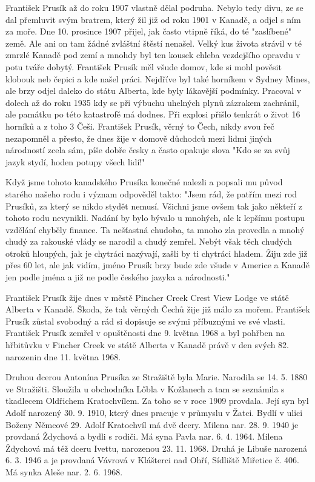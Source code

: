 \documentclass[../dejiny-rodu-prusiku.tex]{subfiles}
\begin{document}
František Prusík až do roku 1907 vlastně dělal podruha. Nebylo tedy divu, ze se dal přemluvit svým bratrem, který žil již od roku 1901 v Kanadě, a odjel s ním za moře. Dne 10. prosince 1907 přijel, jak často vtipně říká, do té "zaslíbené" země. Ale ani on tam žádné zvláštní štěstí nenašel. Velký kus života strávil v té zmrzlé Kanadě pod zemí a mnohdy byl ten kousek chleba vezdejšího opravdu v potu tváře dobytý. František Prusík měl všude domov, kde si mohl pověsit klobouk neb čepici a kde našel práci. Nejdříve byl také horníkem v Sydney Mines, ale brzy odjel daleko do státu Alberta, kde byly lákavější podmínky. Pracoval v dolech až do roku 1935 kdy se při výbuchu uhelných plynů zázrakem zachránil, ale památku po této katastrofě má dodnes. Při explosi přišlo tenkrát o život 16 horníků a z toho 3 Češi. František Prusík, věrný to Čech, nikdy svou řeč nezapomněl a přesto, že dnes žije v domově důchodců mezi lidmi jiných národností zcela sám,  píše dobře česky a často opakuje slova "Kdo se za svůj jazyk stydí, hoden potupy všech lidí!"

Když jsme tohoto kanadského Prusíka konečné nalezli a popsali mu původ starého našeho rodu i význam odpově­děl takto: "Jsem rád, že patřím mezi rod Prusíků, za který se nikdo stydět nemusí. Všichni jsme ovšem tak jako někteří z tohoto rodu nevynikli. Nadání by bylo bývalo u mnohých, ale k lepšímu postupu vzdělání chyběly finance. Ta nešťastná chudoba, ta mnoho zla provedla a mnohý chudý za rakouské vlády se narodil a chudý zemřel. Nebýt však těch chudých otroků hloupých, jak je chytrá­ci nazývají, zašli by ti chytráci hladem. Žiju zde již přes 60 let, ale jak vidím, jméno Prusík brzy bude zde všude v Americe a Kanadě jen podle jména a již ne podle českého jazyka a národnosti."

František Prusík žije dnes v městě Pincher Creek Crest View Lodge ve státě Alberta v Kanadě. Škoda, že tak věrných Čechů žije již málo za mořem. František Prusík zůstal svobodný a rád si dopisuje se svými příbuznými ve své vlasti. František Prusík zemřel v opuštěnosti dne 9. května 1968 a byl pohřben na hřbitůvku v Fincher Creek ve státě Alberta v Kanadě právě v den svých 82. narozenin dne 11. května 1968.

Druhou dcerou Antonína Prusíka ze Stražiště byla Marie. Narodila se 14. 5. 1880 ve Stražišti. Sloužila u obchodníka Lőbla v Kožlanech a tam se seznámila s tkadlecem Oldřichem Kratochvílem. Za toho se v roce 1909 provdala. Její syn byl Adolf  narozený 30. 9. 1910, který dnes pracuje v průmyslu v Žatci. Bydlí v ulici Boženy Němcové 29. Adolf Kratochvíl má dvě dcery. Milena nar. 28. 9. 1940 je provdaná Ždychová a bydli s rodiči. Má syna Pavla nar. 6. 4. 1964. Milena Ždychová má též dceru Ivettu, narozenou 23. 11. 1968. Druhá je Libuše narozená 6. 3. 1946 a je provdaná Vávrová v Klášterci nad Ohří, Sídliště Miřetice č. 406. Má synka Aleše nar. 2. 6. 1968.
\end{document}
